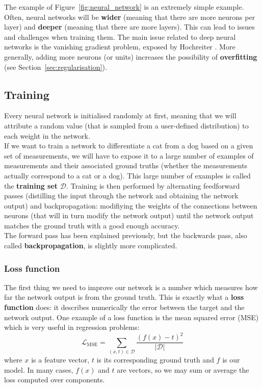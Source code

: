 The example of Figure~\ref{fig:neural_network} is an extremely simple example.
Often, neural networks will be \textbf{wider} (meaning that there are more
neurons per layer) and \textbf{deeper} (meaning that there are more layers).
This can lead to issues and challenges when training them. The main issue
related to deep neural networks is the vanishing gradient problem, exposed
by Hochreiter \cite{vanishing_gradient}. More generally, adding more 
neurons (or units) increases the possibility of \textbf{overfitting} (see
Section~\ref{sec:regularisation}).

\subsection{Training}
\label{nn:training}
Every neural network is initialised randomly at first, meaning that we will
attribute a random value (that is sampled from a user-defined distribution)
to each weight in the network.\\

If we want to train a network to differentiate a cat from a dog based on a
given set of measurements, we will have to expose it to a large number of examples
of measurements and their associated ground truths 
(whether the measurements actually correspond to a cat or a dog). This large
number of examples is called the \textbf{training set} $\mathcal{D}$. 
 Training is
then performed by alternating feedforward passes (distilling the input through
the network and obtaining the network output) and backpropagation: modifiying 
the weights of the connections between neurons (that will in turn modify 
the network output) until the network output matches the ground truth with 
a good enough accuracy.\\

The forward pass has been explained previously, but the backwards pass, also
called \textbf{backpropagation}, is slightly more complicated.\\

\subsubsection{Loss function}
The first thing we need to improve our network is a number which measures
how far the network output is from the ground truth.
This is exactly what a \textbf{loss function}  does: 
it describes numerically the error between the target and the network output.
One example of a loss function is the mean squared error (MSE)  which
is very useful in regression problems:
$$ \mathcal{L}_{\text{MSE}} = \sum\limits_{(x, t) \in \mathcal{D}}\frac{(f(x)-t)^2}{|\mathcal{D}|}$$
where $x$ is a feature vector, $t$ is its corresponding ground truth and $f$
is our model. In
many cases, $f(x)$ and $t$ are vectors, so we may sum or average the loss computed
over components.\\

